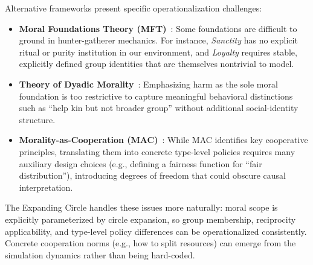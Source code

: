 Alternative frameworks present specific operationalization challenges:
\begin{itemize}
    \item \textbf{Moral Foundations Theory (MFT)}~\citep{Haidt2007MFT}: Some foundations are difficult to ground in hunter-gatherer mechanics. For instance, \textit{Sanctity} has no explicit ritual or purity institution in our environment, and \textit{Loyalty} requires stable, explicitly defined group identities that are themselves nontrivial to model.
    \item \textbf{Theory of Dyadic Morality}~\citep{Gray2012TDM}: Emphasizing harm as the sole moral foundation is too restrictive to capture meaningful behavioral distinctions such as ``help kin but not broader group'' without additional social-identity structure.
    \item \textbf{Morality-as-Cooperation (MAC)}~\citep{Curry2019MAC}: While MAC identifies key cooperative principles, translating them into concrete type-level policies requires many auxiliary design choices (e.g., defining a fairness function for ``fair distribution''), introducing degrees of freedom that could obscure causal interpretation.
\end{itemize}

The Expanding Circle handles these issues more naturally: moral scope is explicitly parameterized by circle expansion, so group membership, reciprocity applicability, and type-level policy differences can be operationalized consistently. Concrete cooperation norms (e.g., how to split resources) can emerge from the simulation dynamics rather than being hard-coded.
